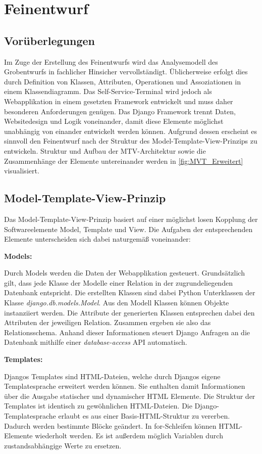 \section{Feinentwurf}
\subsection{Vorüberlegungen}
Im Zuge der Erstellung des Feinentwurfs wird das Analysemodell des Grobentwurfs in fachlicher Hinsicher vervollständigt. Üblicherweise erfolgt dies durch Definition von Klassen, Attributen, Operationen und Assoziationen in einem Klassendiagramm. Das Self-Service-Terminal wird jedoch als Webapplikation in einem gesetzten Framework entwickelt und muss daher besonderen Anforderungen genügen.
Das Django Framework trennt Daten, Websitedesign und Logik voneinander, damit diese Elemente möglichst unabhängig von einander entwickelt werden können. Aufgrund dessen erscheint es sinnvoll den Feinentwurf nach der Struktur des Model-Template-View-Prinzips zu entwickeln. Struktur und Aufbau der MTV-Architektur sowie die Zusammenhänge der Elemente untereinander werden in \ref{fig:MVT_Erweitert} visualisiert.

\vspace{0,5cm}

\subsection{Model-Template-View-Prinzip}
Das Model-Template-View-Prinzip basiert auf einer möglichst losen Kopplung der Softwareelemente Model, Template und View. Die Aufgaben der entsprechenden Elemente unterscheiden sich dabei naturgemäß voneinander:\par 
\newpage 
\noindent \textbf{Models:} \par
\vspace{0,5cm}
\noindent Durch Models werden die Daten der Webapplikation gesteuert. Grundsätzlich gilt, dass jede Klasse der Modelle einer Relation in der zugrundeliegenden Datenbank entspricht. Die erstellten Klassen sind dabei Python Unterklassen der Klasse \textit{django.db.models.Model}. Aus den Modell Klassen können Objekte instanziiert werden. Die Attribute der generierten Klassen entsprechen dabei den Attributen der jeweiligen Relation. Zusammen ergeben sie also das Relationsschema. Anhand dieser Informationen steuert Django Anfragen an die Datenbank mithilfe einer \textit{database-access} API automatisch.\par
\vspace{1cm}
\noindent \textbf{Templates:}\par
\vspace{0,5cm}
\noindent Djangos Templates sind HTML-Dateien, welche durch Djangos eigene Templatesprache erweitert werden können. Sie enthalten damit Informationen über die Ausgabe statischer und dynamischer HTML Elemente. Die Struktur der Templates ist identisch zu gewöhnlichen HTML-Dateien. Die Django-Templatesprache erlaubt es aus einer Basis-HTML-Struktur zu vererben. Dadurch werden bestimmte Blöcke geändert. In for-Schleifen können HTML-Elemente wiederholt werden. Es ist außerdem möglich Variablen durch zustandsabhängige Werte zu ersetzen.


